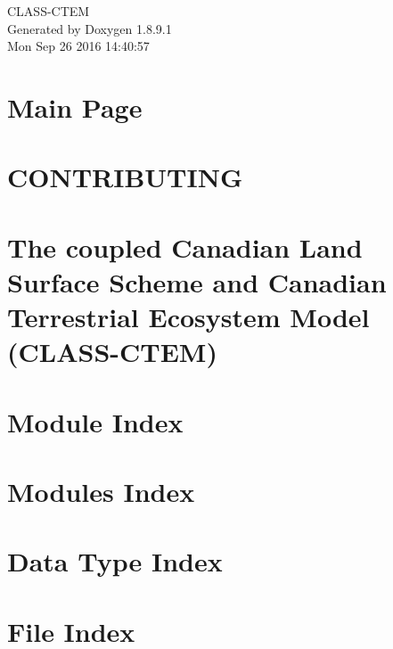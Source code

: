 \documentclass[twoside]{book}
\newcommand{\+}{\discretionary{\mbox{\scriptsize$\hookleftarrow$}}{}{}}
\newcommand{\clearemptydoublepage}{%
  \newpage{\pagestyle{empty}\cleardoublepage}%
}
\begin{document}
\hypersetup{pageanchor=false,
             bookmarks=true,
             bookmarksnumbered=true,
             pdfencoding=unicode
            }
\begin{titlepage}
\vspace*{7cm}
\begin{center}%
{\Large C\+L\+A\+S\+S-\/\+C\+T\+E\+M }\\
\vspace*{1cm}
{\large Generated by Doxygen 1.8.9.1}\\
\vspace*{0.5cm}
{\small Mon Sep 26 2016 14:40:57}\\
\end{center}
\end{titlepage}
\clearemptydoublepage
\tableofcontents
\clearemptydoublepage
{}
\hypersetup{pageanchor=true}

\chapter{Main Page}
\label{index}\hypertarget{index}{}
\chapter{C\+O\+N\+T\+R\+I\+B\+U\+T\+I\+N\+G}
\label{md_CONTRIBUTING}
\hypertarget{md_CONTRIBUTING}{}

\chapter{The coupled Canadian Land Surface Scheme and Canadian Terrestrial Ecosystem Model (C\+L\+A\+S\+S-\/\+C\+T\+E\+M)}
\label{md_README}
\hypertarget{md_README}{}

\chapter{Module Index}

\chapter{Modules Index}

\chapter{Data Type Index}

\chapter{File Index}

\end{document}
